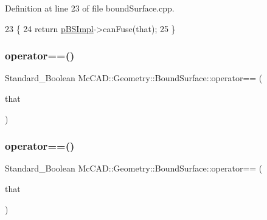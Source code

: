 Definition at line 23 of file bound\+Surface.\+cpp.


\begin{DoxyCode}
23                                                                             \{
24   \textcolor{keywordflow}{return} \hyperlink{classMcCAD_1_1Geometry_1_1BoundSurface_ae678fabb46e22b7a68a336051b366ddf}{pBSImpl}->canFuse(that);
25 \}
\end{DoxyCode}
\mbox{\label{classMcCAD_1_1Geometry_1_1BoundSurface_a5c7eafa600bd89b55fa06ddb9b21cc08}} 
\subsubsection{\texorpdfstring{operator==()}{operator==()}\hspace{0.1cm}{\footnotesize\ttfamily [1/2]}}
{\footnotesize\ttfamily Standard\+\_\+\+Boolean Mc\+C\+A\+D\+::\+Geometry\+::\+Bound\+Surface\+::operator== (\begin{DoxyParamCaption}\item[{const \hyperlink{classMcCAD_1_1Geometry_1_1BoundSurface}{Bound\+Surface} \&}]{that }\end{DoxyParamCaption})\hspace{0.3cm}{\ttfamily [inherited]}}

\mbox{\label{classMcCAD_1_1Geometry_1_1BoundSurface_a5c7eafa600bd89b55fa06ddb9b21cc08}} 
\subsubsection{\texorpdfstring{operator==()}{operator==()}\hspace{0.1cm}{\footnotesize\ttfamily [2/2]}}
{\footnotesize\ttfamily Standard\+\_\+\+Boolean Mc\+C\+A\+D\+::\+Geometry\+::\+Bound\+Surface\+::operator== (\begin{DoxyParamCaption}\item[{const \hyperlink{classMcCAD_1_1Geometry_1_1BoundSurface}{Bound\+Surface} \&}]{that }\end{DoxyParamCaption})\hspace{0.3cm}{\ttfamily [inherited]}}



